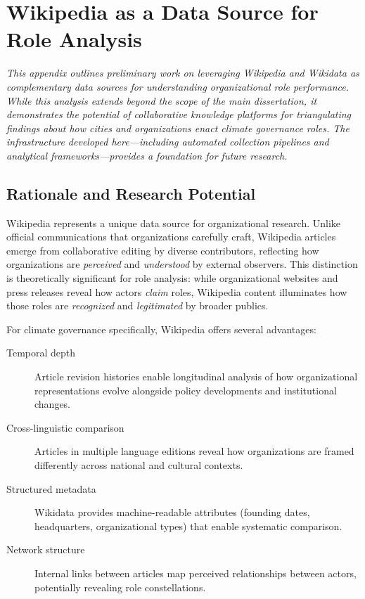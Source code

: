 \chapter{Wikipedia as a Data Source for Role Analysis}
\label{app:wikipedia}

\noindent\textit{This appendix outlines preliminary work on leveraging Wikipedia and Wikidata as complementary data sources for understanding organizational role performance. While this analysis extends beyond the scope of the main dissertation, it demonstrates the potential of collaborative knowledge platforms for triangulating findings about how cities and organizations enact climate governance roles. The infrastructure developed here---including automated collection pipelines and analytical frameworks---provides a foundation for future research.}

\bigskip

\section{Rationale and Research Potential}

Wikipedia represents a unique data source for organizational research. Unlike official communications that organizations carefully craft, Wikipedia articles emerge from collaborative editing by diverse contributors, reflecting how organizations are \emph{perceived} and \emph{understood} by external observers. This distinction is theoretically significant for role analysis: while organizational websites and press releases reveal how actors \emph{claim} roles, Wikipedia content illuminates how those roles are \emph{recognized} and \emph{legitimated} by broader publics.

For climate governance specifically, Wikipedia offers several advantages:

\begin{description}
    \item[Temporal depth] Article revision histories enable longitudinal analysis of how organizational representations evolve alongside policy developments and institutional changes.
    \item[Cross-linguistic comparison] Articles in multiple language editions reveal how organizations are framed differently across national and cultural contexts.
    \item[Structured metadata] Wikidata provides machine-readable attributes (founding dates, headquarters, organizational types) that enable systematic comparison.
    \item[Network structure] Internal links between articles map perceived relationships between actors, potentially revealing role constellations.
\end{description}

